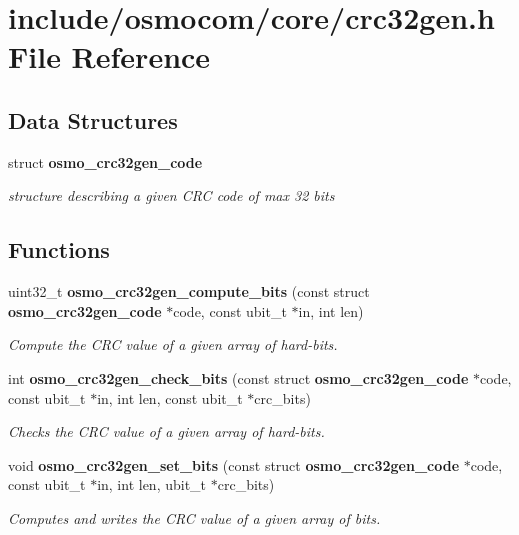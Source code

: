 \section{include/osmocom/core/crc32gen.h File Reference}
\label{crc32gen_8h}
\subsection*{Data Structures}
\begin{DoxyCompactItemize}
\item 
struct {\bf osmo\-\_\-crc32gen\-\_\-code}
\begin{DoxyCompactList}\small\item\em structure describing a given C\-R\-C code of max 32 bits \end{DoxyCompactList}\end{DoxyCompactItemize}
\subsection*{Functions}
\begin{DoxyCompactItemize}
\item 
uint32\-\_\-t {\bf osmo\-\_\-crc32gen\-\_\-compute\-\_\-bits} (const struct {\bf osmo\-\_\-crc32gen\-\_\-code} $\ast$code, const ubit\-\_\-t $\ast$in, int len)
\begin{DoxyCompactList}\small\item\em Compute the C\-R\-C value of a given array of hard-\/bits. \end{DoxyCompactList}\item 
int {\bf osmo\-\_\-crc32gen\-\_\-check\-\_\-bits} (const struct {\bf osmo\-\_\-crc32gen\-\_\-code} $\ast$code, const ubit\-\_\-t $\ast$in, int len, const ubit\-\_\-t $\ast$crc\-\_\-bits)
\begin{DoxyCompactList}\small\item\em Checks the C\-R\-C value of a given array of hard-\/bits. \end{DoxyCompactList}\item 
void {\bf osmo\-\_\-crc32gen\-\_\-set\-\_\-bits} (const struct {\bf osmo\-\_\-crc32gen\-\_\-code} $\ast$code, const ubit\-\_\-t $\ast$in, int len, ubit\-\_\-t $\ast$crc\-\_\-bits)
\begin{DoxyCompactList}\small\item\em Computes and writes the C\-R\-C value of a given array of bits. \end{DoxyCompactList}\end{DoxyCompactItemize}
